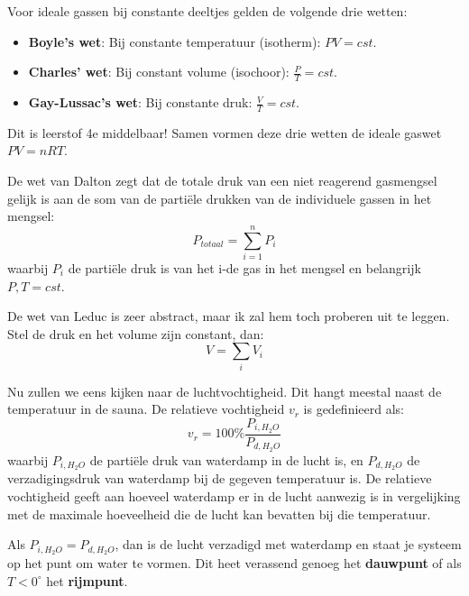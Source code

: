 Voor ideale gassen bij constante deeltjes gelden de volgende drie wetten:
\begin{itemize}
    \item \textbf{Boyle's wet}: Bij constante temperatuur (isotherm): \(PV = cst\).
    \item \textbf{Charles' wet}: Bij constant volume (isochoor): \(\frac{P}{T} = cst\).
    \item \textbf{Gay-Lussac's wet}: Bij constante druk: \(\frac{V}{T} = cst\).
\end{itemize}
Dit is leerstof 4e middelbaar!
Samen vormen deze drie wetten de ideale gaswet \(PV = nRT\).

De wet van Dalton zegt dat de totale druk van een niet reagerend gasmengsel gelijk is aan de som van de partiële drukken van de individuele gassen in het mengsel:
\[P_{totaal} = \sum_{i=1}^n P_i\]
waarbij \(P_i\) de partiële druk is van het i-de gas in het mengsel en belangrijk \(P,T = cst\).

De wet van Leduc is zeer abstract, maar ik zal hem toch proberen uit te leggen. Stel de druk en het volume zijn constant, dan:
\[V = \sum_i V_i\]

Nu zullen we eens kijken naar de luchtvochtigheid. Dit hangt meestal naast de temperatuur in de sauna.
De relatieve vochtigheid \(v_r \) is gedefinieerd als:
\[v_r = 100\%\frac{P_{i,H_2O}}{P_{d,H_2O}}\]
waarbij \(P_{i,H_2O}\) de partiële druk van waterdamp in de lucht is, en \(P_{d,H_2O}\) de verzadigingsdruk van waterdamp bij de gegeven temperatuur is.
De relatieve vochtigheid geeft aan hoeveel waterdamp er in de lucht aanwezig is in vergelijking met de maximale hoeveelheid die de lucht kan bevatten bij die temperatuur.

Als \(P_{i,H_2O} = P_{d,H_2O}\), dan is de lucht verzadigd met waterdamp en staat je systeem op het punt om water te vormen. Dit heet verassend genoeg het \textbf{dauwpunt} of als \(T<0^\circ\) het \textbf{rijmpunt}.
